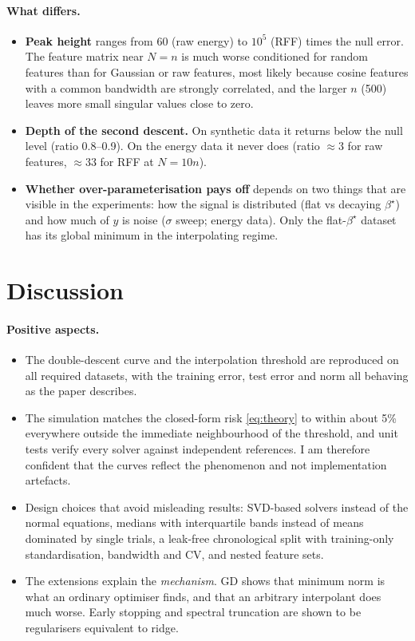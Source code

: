 \documentclass[10pt,a4paper]{article}
\begin{document}
\paragraph{What differs.}
\begin{itemize}
  \item \textbf{Peak height} ranges from 60 (raw energy) to $10^5$ (RFF) times the null error. The feature matrix near $N=n$ is much worse conditioned for random features than for Gaussian or raw features, most likely because cosine features with a common bandwidth are strongly correlated, and the larger $n$ (500) leaves more small singular values close to zero.
  \item \textbf{Depth of the second descent.} On synthetic data it returns below the null level (ratio 0.8--0.9). On the energy data it never does (ratio $\approx3$ for raw features, $\approx33$ for RFF at $N=10n$).
  \item \textbf{Whether over-parameterisation pays off} depends on two things that are visible in the experiments: how the signal is distributed (flat vs decaying $\beta^\star$) and how much of $y$ is noise ($\sigma$ sweep; energy data). Only the flat-$\beta^\star$ dataset has its global minimum in the interpolating regime.
\end{itemize}

\section{Discussion}
\paragraph{Positive aspects.}
\begin{itemize}
  \item The double-descent curve and the interpolation threshold are reproduced on all required datasets, with the training error, test error and norm all behaving as the paper describes.
  \item The simulation matches the closed-form risk \eqref{eq:theory} to within about 5\% everywhere outside the immediate neighbourhood of the threshold, and unit tests verify every solver against independent references. I am therefore confident that the curves reflect the phenomenon and not implementation artefacts.
  \item Design choices that avoid misleading results: SVD-based solvers instead of the normal equations, medians with interquartile bands instead of means dominated by single trials, a leak-free chronological split with training-only standardisation, bandwidth and CV, and nested feature sets.
  \item The extensions explain the \emph{mechanism}. GD shows that minimum norm is what an ordinary optimiser finds, and that an arbitrary interpolant does much worse. Early stopping and spectral truncation are shown to be regularisers equivalent to ridge.
\end{itemize}
\end{document}
